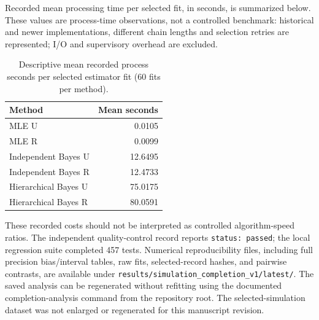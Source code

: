 \documentclass[a4paper,11pt]{article}
\begin{document}
Recorded mean processing time per selected fit, in seconds, is summarized below. These values are process-time observations, not a controlled benchmark: historical and newer implementations, different chain lengths and selection retries are represented; I/O and supervisory overhead are excluded.
\begin{table}[htbp]\centering\small
\caption{Descriptive mean recorded process seconds per selected estimator fit ($60$ fits per method).}\label{tab:timings}
\begin{tabular}{lr}\toprule
Method & Mean seconds\\\midrule
MLE U & 0.0105\\
MLE R & 0.0099\\
Independent Bayes U & 12.6495\\
Independent Bayes R & 12.4733\\
Hierarchical Bayes U & 75.0175\\
Hierarchical Bayes R & 80.0591\\\bottomrule
\end{tabular}\end{table}
These recorded costs should not be interpreted as controlled algorithm-speed ratios. The independent quality-control record reports \texttt{status: passed}; the local regression suite completed 457 tests. Numerical reproducibility files, including full precision bias/interval tables, raw fits, selected-record hashes, and pairwise contrasts, are available under \texttt{results/simulation\_completion\_v1/latest/}. The saved analysis can be regenerated without refitting using the documented completion-analysis command from the repository root. The selected-simulation dataset was not enlarged or regenerated for this manuscript revision.
\end{document}
